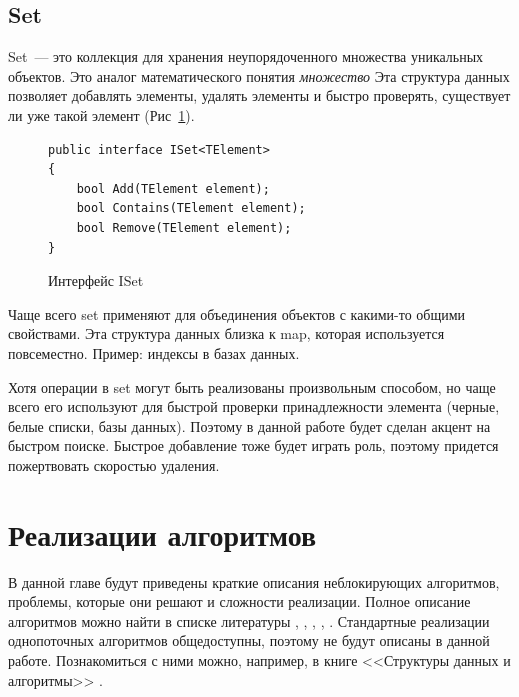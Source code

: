\documentclass[12pt]{report}
\begin{document}
{		\section{Set}
		
		Set~--- это коллекция для хранения неупорядоченного множества уникальных объектов. Это аналог математического понятия \textit{множество} Эта структура данных позволяет добавлять элементы, удалять элементы и быстро проверять, существует ли уже такой элемент (Рис~\ref{pic:Set}). 
		\begin{figure}[h]
			\begin{lstlisting}
public interface ISet<TElement>
{
	bool Add(TElement element);
	bool Contains(TElement element);
	bool Remove(TElement element);
}
			\end{lstlisting}
			\caption{Интерфейс ISet}
			\label{pic:Set}
		\end{figure}
		\par Чаще всего set применяют для объединения объектов с какими-то общими свойствами. Эта структура данных близка к map, которая используется повсеместно. Пример: индексы в базах данных.
		\par Хотя операции в set могут быть реализованы произвольным способом, но чаще всего его используют для быстрой проверки принадлежности элемента (черные, белые списки, базы данных). Поэтому в данной работе будет сделан акцент на быстром поиске. Быстрое добавление тоже будет играть роль, поэтому придется пожертвовать скоростью удаления.		
		
		\chapter{Реализации алгоритмов}
		\par В данной главе будут приведены краткие описания неблокирующих алгоритмов, проблемы, которые они решают и сложности реализации. Полное описание алгоритмов можно найти в списке литературы \cite{LinkedList}, \cite{ListSkipList}, \cite{ListAndSkipList}, \cite{HashTable}, \cite{artOfMultiprocessor}. Стандартные реализации однопоточных алгоритмов общедоступны, поэтому не будут описаны в данной работе. Познакомиться с ними можно, например, в книге <<Структуры данных и алгоритмы>> \cite{dataStructures}.
}
\end{document}
